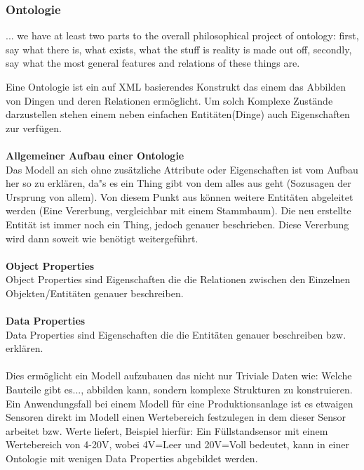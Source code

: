 \subsubsection{Ontologie}
\begin{displayquote}... we have at least two parts to the overall philosophical project of ontology: first, say what there is, what exists, what the stuff is reality is made out off, secondly, say what the most general features and relations of these things are.
\end{displayquote}
Eine Ontologie ist ein auf XML basierendes Konstrukt das einem das Abbilden von Dingen und deren Relationen ermöglicht. Um solch Komplexe Zustände darzustellen stehen einem neben einfachen Entitäten(Dinge) auch Eigenschaften zur verfügen.\\
\\
\textbf{Allgemeiner Aufbau einer Ontologie}\\
Das Modell an sich ohne zusätzliche Attribute oder Eigenschaften ist vom Aufbau her so zu erklären, da"s es ein Thing gibt von dem alles aus geht (Sozusagen der Ursprung von allem). Von diesem Punkt aus können weitere Entitäten abgeleitet werden (Eine Vererbung, vergleichbar mit einem Stammbaum). Die neu erstellte Entität ist immer noch ein Thing, jedoch genauer beschrieben. Diese Vererbung wird dann soweit wie benötigt weitergeführt.\\
\\
\textbf{Object Properties}\\
Object Properties sind Eigenschaften die die Relationen zwischen den Einzelnen Objekten/Entitäten genauer beschreiben.\\ 
\\
\textbf{Data Properties}\\
Data Properties sind Eigenschaften die die Entitäten genauer beschreiben bzw. erklären. 
\\
\\
Dies ermöglicht ein Modell aufzubauen das nicht nur Triviale Daten wie: Welche Bauteile gibt es..., abbilden kann, sondern komplexe Strukturen zu konstruieren. Ein Anwendungsfall bei einem Modell für eine Produktionsanlage ist es etwaigen Sensoren direkt im Modell einen Wertebereich festzulegen in dem dieser Sensor arbeitet bzw. Werte liefert, Beispiel hierfür: Ein Füllstandsensor mit einem Wertebereich von 4-20V, wobei 4V=Leer und 20V=Voll bedeutet, kann in einer Ontologie mit wenigen Data Properties abgebildet werden.
